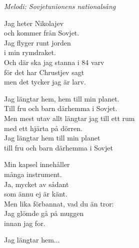 {\footnotesize\textit{Melodi: Sovjetunionens nationalsång}}\par
\vspace{10pt}
Jag heter Nikolajev\\
och kommer från Sovjet.\\
Jag flyger runt jorden\\
i min rymdraket.\\
Och där ska jag stanna i 84 varv\\
för det har Chrustjev sagt\\
men det tycker jag är larv.\par
\vspace{10pt}
Jag längtar hem, hem till min planet.\\
Till fru och barn därhemma i Sovjet.\\
Men mest utav allt längtar jag till ett rum\\
med ett hjärta på dörren.\\
Jag längtar hem till min planet\\
till fru och barn därhemma i Sovjet\par
\vspace{10pt}
Min kapsel innehåller\\
många instrument.\\
Ja, mycket av sådant\\
som ännu ej är känt.\\
Men lika förbannat, vad du än tror:\\
Jag glömde gå på muggen\\
innan jag for.\par
\vspace{10pt}
Jag längtar hem...
